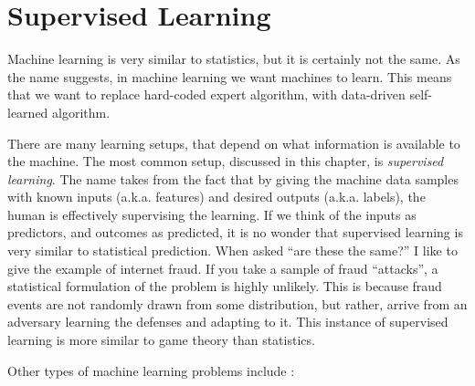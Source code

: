 \documentclass[]{book}
\theoremstyle{definition}
\theoremstyle{definition}
\theoremstyle{definition}
\theoremstyle{remark}
\begin{document}
\chapter{Supervised Learning}\label{supervised}

Machine learning is very similar to statistics, but it is certainly not
the same. As the name suggests, in machine learning we want machines to
learn. This means that we want to replace hard-coded expert algorithm,
with data-driven self-learned algorithm.

There are many learning setups, that depend on what information is
available to the machine. The most common setup, discussed in this
chapter, is \emph{supervised learning}. The name takes from the fact
that by giving the machine data samples with known inputs (a.k.a.
features) and desired outputs (a.k.a. labels), the human is effectively
supervising the learning. If we think of the inputs as predictors, and
outcomes as predicted, it is no wonder that supervised learning is very
similar to statistical prediction. When asked ``are these the same?'' I
like to give the example of internet fraud. If you take a sample of
fraud ``attacks'', a statistical formulation of the problem is highly
unlikely. This is because fraud events are not randomly drawn from some
distribution, but rather, arrive from an adversary learning the defenses
and adapting to it. This instance of supervised learning is more similar
to game theory than statistics.

Other types of machine learning problems include
\citep{sammut2011encyclopedia}:
\end{document}
